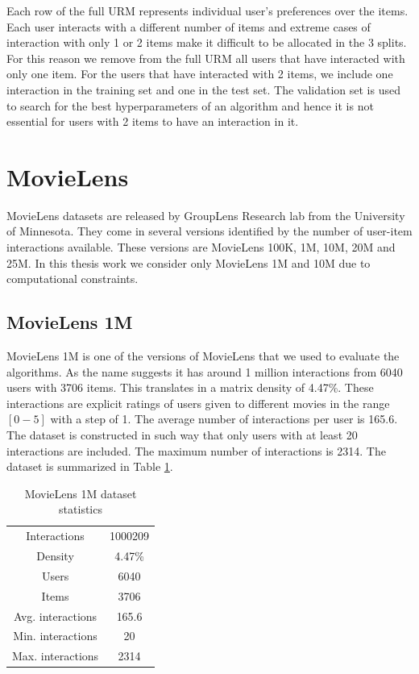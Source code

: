 Each row of the full URM represents individual user's preferences over the items. Each user interacts with a different number of items and extreme cases of interaction with only 1 or 2 items make it difficult to be allocated in the 3 splits. For this reason we remove from the full URM all users that have interacted with only one item. For the users that have interacted with 2 items, we include one interaction in the training set and one in the test set. The validation set is used to search for the best hyperparameters of an algorithm and hence it is not essential for users with 2 items to have an interaction in it.

\section{MovieLens}
MovieLens\cite{harper2015movielens} datasets are released by GroupLens Research lab from the University of Minnesota. They come in several versions identified by the number of user-item interactions available. These versions are MovieLens 100K, 1M, 10M, 20M and 25M. In this thesis work we consider only MovieLens 1M and 10M due to computational constraints.

\subsection{MovieLens 1M}
MovieLens 1M is one of the versions of MovieLens that we used to evaluate the algorithms. As the name suggests it has around 1 million interactions from 6040 users with 3706 items. This translates in a matrix density of 4.47\%. These interactions are explicit ratings of users given to different movies in the range $[0-5]$ with a step of 1. The average number of interactions per user is 165.6. The dataset is constructed in such way that only users with at least 20 interactions are included. The maximum number of interactions is 2314. The dataset is summarized in Table \ref{tab:ml1m_stats}.

\begin{table}[h!]
    \centering
    \begin{tabular}{c|c}
        \hline
        Interactions & 1000209 \\
        Density & 4.47\% \\
        Users & 6040 \\
        Items & 3706 \\
        Avg. interactions & 165.6 \\
        Min. interactions & 20 \\
        Max. interactions & 2314 \\
        \hline
    \end{tabular}
    \caption{MovieLens 1M dataset statistics}
    \label{tab:ml1m_stats}
\end{table}

